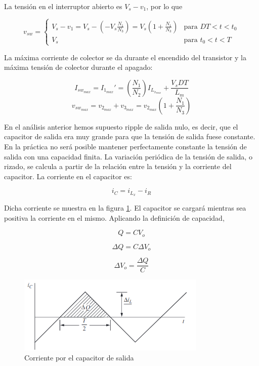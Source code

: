 La tensión en el interruptor abierto es $V_s-v_1$, por lo que

$$
v_{sw}=
\begin{cases}
    V_s-v_1=V_s-\left(-V_s\frac{N_1}{N_3}\right)=V_s\left(1+\frac{N_1}{N_3}\right) & \text{para $DT<t<t_0$}\\
    V_s & \text{para $t_0<t<T$}
\end{cases}
$$

La máxima corriente de colector se da durante el encendido del transistor y la máxima tensión de colector durante el apagado:

$$ I_{sw_{max}}=I_{1_{max}}'=\left(\frac{N_1}{N_2}\right)I_{L_{x_{max}}}+\frac{V_sDT}{L_m} $$
$$ v_{sw_{max}}=v_{2_{max}}+v_{3_{max}}=v_{2_{max}}\left(1+\frac{N_1}{N_3}\right) $$

En el análisis anterior hemos supuesto ripple de salida nulo, es decir, que el capacitor de salida era muy grande para que la tensión
de salida fuese constante. En la práctica no será posible mantener perfectamente constante la
tensión de salida con una capacidad finita. La variación periódica de la tensión de salida, o rizado,
se calcula a partir de la relación entre la tensión y la corriente del capacitor. 
La corriente en el capacitor es:

$$ i_C=i_{L_x}-i_R $$

Dicha corriente se muestra en la figura \ref{fig:buck_converter_capacitor_current}.
El capacitor se cargará mientras sea positiva la corriente en el mismo. Aplicando la definición de capacidad,

$$ Q=CV_o $$

$$ \Delta Q=C\Delta V_o $$

$$ \Delta V_o=\frac{\Delta Q}{C} $$

\begin{figure}[ht]
    \centering
    \includegraphics[width=0.8\textwidth]{../images/hart/buck_converter_capacitor_current.png}
    \caption{Corriente por el capacitor de salida}
    \label{fig:buck_converter_capacitor_current}
\end{figure}

